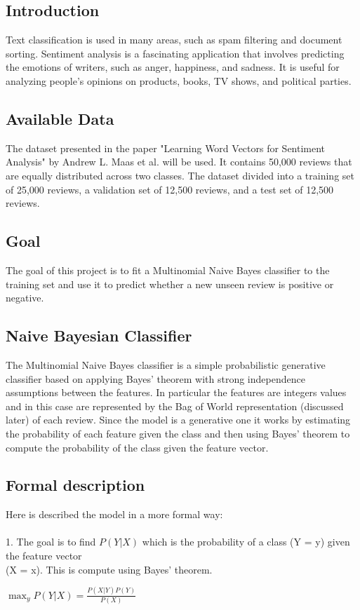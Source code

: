 \documentclass{article}
\begin{document}
\begin{multicols}{2}
    
\section{Introduction}
Text classification is used in many areas, such as spam filtering and document sorting. Sentiment analysis is a fascinating application that involves predicting the 
emotions of writers, such as anger, happiness, and sadness. It is useful for analyzing people's opinions on products, books, TV shows, and political parties.

\subsection{Available Data}
The dataset presented in the paper "Learning Word Vectors for Sentiment Analysis" by Andrew L. Maas et al. will be used. It contains 50,000 reviews that are 
equally distributed across two classes. The dataset divided into a training set of 25,000 reviews, a validation set of 12,500 reviews, and a test set of 
12,500 reviews.
\subsection{Goal}
The goal of this project is to fit a Multinomial Naive Bayes classifier to the training set and use it to predict whether a new unseen review is positive or negative.

\subsection{Naive Bayesian Classifier}
The Multinomial Naive Bayes classifier is a simple probabilistic generative classifier based on applying Bayes' theorem with strong independence assumptions between the features.
In particular the features are integers values and in this case are represented by the Bag of World representation (discussed later) of each review. Since the model is a generative
one it works by estimating the probability of each feature given the class and then using Bayes' theorem to compute the probability of the class given the feature vector.
\subsection*{Formal description}
Here is described the model in a more formal way:\\
\\
1. The goal is to find $P(Y|X)$ which is the probability of a class (Y = y) given the feature vector \\
(X = x). This is compute using Bayes' theorem.
    \vspace{0.3cm}\begin{center} $\max_y{P(Y|X)} = \frac{P(X|Y)P(Y)}{P(X)}$ \end{center}\vspace{0.3cm}


\end{multicols}
\end{document}
